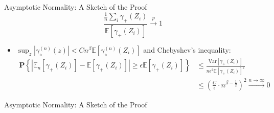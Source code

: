  \begin{frame}{Asymptotic Normality: A Sketch of the Proof}
    $$
    \frac{\frac{1}{n}\sum_{i}\gamma_{+}\left(Z_{i}\right)}{\mathbb{E}\left[\gamma_{+}\left(Z_{i}\right)\right]} \xrightarrow{p} 1
    $$

    \begin{itemize}
        \item \textcolor{mygreen}{$\boxed{\sup_{z}\left|\gamma_{\diamond}^{\left(n\right)}\left(z\right)\right|<Cn^{\beta}  \mathbb{E} \left[\gamma_{\diamond}^{\left(n\right)}\left(Z_{i}\right)\right]}$} and \textcolor{mygreen}{Chebyshev's inequality}:
        \begin{align*}
            \mathbf{P}\left\{ \left|\mathbb{E}_{n}\left[\gamma_{+}\left(Z_{i}\right)\right]-\mathbb{E}\left[\gamma_{+}\left(Z_{i}\right)\right]\right|\geq\epsilon\mathbb{E}\left[\gamma_{+}\left(Z_{i}\right)\right]\right\} &\leq\frac{\mathrm{Var}\left[\gamma_{+}\left(Z_{i}\right)\right]}{n\epsilon^{2}\mathbb{E}\left[\gamma_{+}\left(Z_{i}\right)\right]^{2}} \\ 
            & \leq \left(\frac{C}{\epsilon}\cdot n^{\beta-\frac{1}{2}}\right)^{2}\xrightarrow{n\rightarrow\infty}0
        \end{align*}
    \end{itemize}
 \end{frame}
 
 \begin{frame}{Asymptotic Normality: A Sketch of the Proof}
    
 \end{frame}

